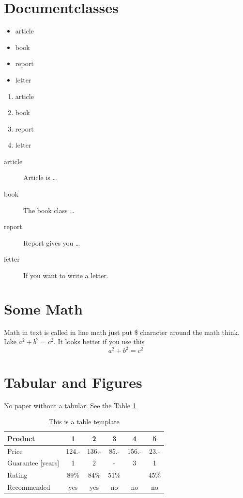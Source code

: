 \documentclass[11pt, a4paper, twoside]{article}
\begin{document}
\section{Documentclasses} \label{documentclasses}

\begin{itemize}
\item article
\item book 
\item report 
\item letter 
\end{itemize}


\begin{enumerate}
\item article
\item book 
\item report 
\item letter 
\end{enumerate}

\begin{description}
\item[article\label{article}]{Article is \ldots}
\item[book\label{book}]{The book class \ldots}
\item[report\label{report}]{Report gives you \ldots}
\item[letter\label{letter}]{If you want to write a letter.}
\end{description}

\section{Some Math}
Math in text is called in line math just put \$ character around 
the math think. Like $ a^2 + b^2 = c^2 $. It looks better if you use 
this 
\[a^2 + b^2 = c^2\]


\section{Tabular and Figures}
No paper without a tabular. See the Table \ref{tab:template}

\begin{table}[!b]
\centering
\begin{tabular}{|l|c|c|c|c|c|}
\hline
Product & 1 & 2 & 3 & 4 & 5\\
\hline
Price & 124.- & 136.- & 85.- & 156.- & 23.-\\
Guarantee [years] & 1 & 2 & - & 3 & 1\\
Rating & 89\% & 84\% & 51\% & & 45\%\\
\hline
\hline
Recommended & yes & yes & no & no & no\\
\hline
\end{tabular}
\caption{This is a table template}
\label{tab:template}
\end{table}
\end{document}

